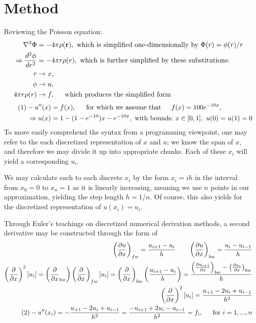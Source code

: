 \documentclass[11pt,a4paper,notitlepage]{article}
\newcommand\pd[2]{\frac{\partial #1}{\partial #2}}
\begin{document}
\section{Method}
Reviewing the Poisson equation:
\begin{align*}
\nabla ^2 \Phi &= -4\pi\rho(\mathbf{r}), \ \text{which is simplified one-dimensionally by} \ \Phi(r) = \phi(r)/r \\
\Rightarrow \frac{d^2 \phi}{dr^2} &= -4\pi r \rho(r), \ \text{which is further simplified by these substitutions:}\\
r &\rightarrow x, \\
\phi &\rightarrow u,\\
4\pi r\rho(r) &\rightarrow f, \indent \text{which produces the simplified form}
\end{align*}
\begin{align*}\label{eq:1}\tag{1}
-u''(x) &= f(x), \indent \text{for which we assume that} \indent f(x) = 100e^{-10x}, \\
\Rightarrow u(x) &= 1- (1-e^{-10})x - e^{-10x},\ \text{with bounds:}\ x \in [0,1],\ u(0) = u(1)= 0
\end{align*}
To more easily comprehend the syntax from a programming viewpoint, one may refer to the each discretized representation of $x$ and $u$; we know the span of $x$, and therefore we may divide it up into appropriate chunks. Each of these $x_i$ will yield a corresponding $u_i$.

We may calculate each to each discrete $x_i$ by the form $x_i = ih$ in the interval from $x_0 = 0$ to $x_{n} = 1$ as it is linearly increasing, meaning we use $n$ points in our approximation, yielding the step length $h = 1/n$. Of course, this also yields for the discretized representation of $u(x_i) = u_i$.


Through Euler's teachings on discretized numerical derivation methods, a second derivative may be constructed through the form of
\begin{align}
\nonumber
\left(\pd{u}{x}\right)_{fw} = \frac{u_{i+1} - u_i}{h} \quad\quad
\left(\pd{u}{x}\right)_{bw} = \frac{u_{i} - u_{i-1}}{h} \\
\nonumber
\left(\pd{}{x}\right)^2[u_i] = \left(\pd{}{x}_{bw}\right)\left(\pd{}{x}\right)_{fw}[u_i] = \left(\pd{}{x}\right)_{bw}\left(\frac{u_{i+1} - u_i}{h}\right) =\frac{\left(\pd{u_{i+1}}{x}\right)_{bw} - \left(\pd{u_i}{x}\right)_{bw}}{h} \\
\nonumber
\left(\pd{}{x}\right)^2[u_i] = \frac{u_{+1} - 2u_i + u_{i-1}}{h^2}\\
\label{eq:2} \tag{2}
-u''(x_i) = - \frac{u_{+1} - 2u_i + u_{i-1}}{h^2} = \frac{- u_{i+1} + 2u_i - u_{i-1}}{h^2} = f_i , \indent \text{for}\ i = 1,...,n
\end{align}
\end{document}
